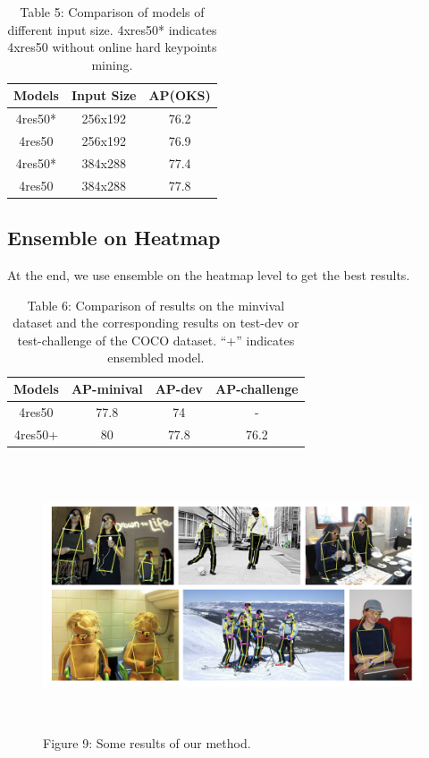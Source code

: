 \captionsetup[table]{labelformat=empty}
\begin{table}[!hbp]
  \centering
  \begin{tabular}{|c|c|c|}
  \hline
  Models          & Input Size & AP(OKS)   \\
  \hline
  4res50* & 256x192 & 76.2 \\
  \hline
  4res50 & 256x192 & 76.9  \\
  \hline
  4res50* & 384x288 & 77.4  \\
  \hline
  4res50 & 384x288 & 77.8  \\
  \hline
  \end{tabular}
  \caption{Table 5: Comparison of models of different input size. 4xres50* indicates 4xres50 without online hard keypoints mining.}
\end{table}

\subsection{Ensemble on Heatmap}

At the end, we use ensemble on the heatmap level to get the best results.

\captionsetup[table]{labelformat=empty}
\begin{table}[!hbp]
  \centering
  \begin{tabular}{|c|c|c|c|}
  \hline
  Models          & AP-minival & AP-dev & AP-challenge  \\
  \hline
  4res50 & 77.8 & 74  & - \\
  \hline
  4res50+ & 80 & 77.8 & 76.2  \\
  \hline
  \end{tabular}
  \caption{Table 6: Comparison of results on the minvival dataset and the corresponding results on test-dev or test-challenge of the COCO
dataset. “+” indicates ensembled model.}
\end{table}

\captionsetup[figure]{labelformat=empty}
\begin{figure}[htbp]
  \centering
  \includegraphics[width=16cm,height=8cm]{source/result.png}
  \caption{Figure 9: Some results of our method.}
\end{figure}






